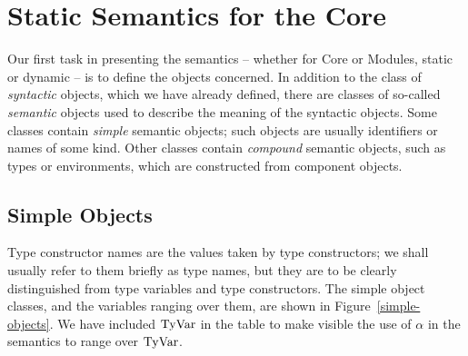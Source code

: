 %

\section{Static Semantics for the Core}
\label{statcor.sec}
Our first task in presenting the semantics -- whether for Core or Modules,
static or dynamic -- is to define the objects concerned. In addition
to the class of {\em syntactic} objects, which we have already defined, 
there are classes of so-called {\em semantic} objects used to describe
the meaning of the syntactic objects. Some classes contain {\em simple}
semantic objects; such objects are usually identifiers or names of some
kind. Other classes contain {\em compound} semantic objects, such as
types or environments, which are constructed from component objects.

\subsection{Simple Objects}
Type constructor names are the values taken by type constructors; we shall
usually refer to them briefly as type names, but they are to be clearly
distinguished from type variables and type constructors. 
 The simple object
classes, and the variables ranging over them, are shown in
Figure~\ref{simple-objects}. We have included ${\rm TyVar}$ in the table to
make visible the use of $\alpha$ in the semantics to range over ${\rm TyVar}$.

